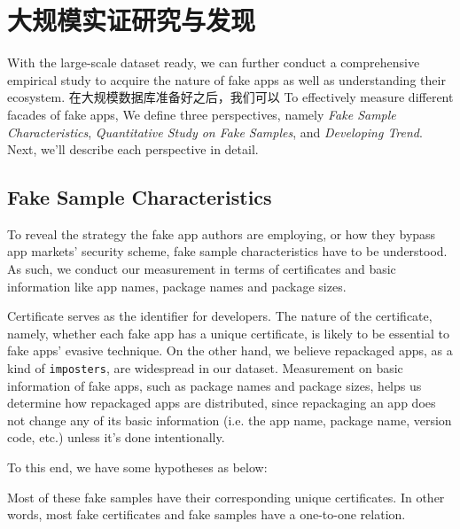 \chapter{大规模实证研究与发现}
\label{chp:discoveries}

With the large-scale dataset ready, we can further conduct a comprehensive empirical study to acquire the nature of fake apps as well as understanding their ecosystem.
在大规模数据库准备好之后，我们可以
To effectively measure different facades of fake apps, We define three perspectives, namely \emph{Fake Sample Characteristics}, \emph{Quantitative Study on Fake Samples}, and \emph{Developing Trend}.
Next, we'll describe each perspective in detail.

\section{Fake Sample Characteristics}
To reveal the strategy the fake app authors are employing, or how they bypass app markets' security scheme, fake sample characteristics have to be understood.
As such, we conduct our measurement in terms of certificates and basic information like app names, package names and package sizes.

Certificate serves as the identifier for developers.
The nature of the certificate, namely, whether each fake app has a unique certificate, is likely to be essential to fake apps' evasive technique.
On the other hand, we believe repackaged apps, as a kind of \texttt{imposters}, are widespread in our dataset.
Measurement on basic information of fake apps, such as package names and package sizes, helps us determine how repackaged apps are distributed, since repackaging an app does not change any of its basic information (i.e. the app name, package name, version code, etc.) unless it's done intentionally.

To this end, we have some hypotheses as below:

 Most of these fake samples have their corresponding unique certificates.
In other words, most fake certificates and fake samples have a one-to-one relation.

